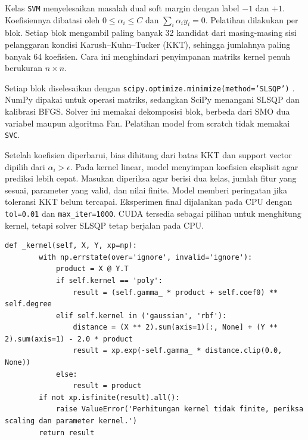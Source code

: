 Kelas \texttt{SVM} menyelesaikan masalah dual soft margin dengan label $-1$ dan $+1$. Koefisiennya dibatasi oleh $0\leq\alpha_i\leq C$ dan $\sum_i\alpha_i y_i=0$. Pelatihan dilakukan per blok. Setiap blok mengambil paling banyak 32 kandidat dari masing-masing sisi pelanggaran kondisi Karush--Kuhn--Tucker (KKT), sehingga jumlahnya paling banyak 64 koefisien. Cara ini menghindari penyimpanan matriks kernel penuh berukuran $n\times n$.

Setiap blok diselesaikan dengan \texttt{scipy.optimize.minimize(method='SLSQP')} \cite{ref:scipy_slsqp}. NumPy dipakai untuk operasi matriks, sedangkan SciPy menangani SLSQP dan kalibrasi BFGS. Solver ini memakai dekomposisi blok, berbeda dari SMO dua variabel maupun algoritma Fan. Pelatihan model from scratch tidak memakai \texttt{SVC}.

Setelah koefisien diperbarui, bias dihitung dari batas KKT dan support vector dipilih dari $\alpha_i>\epsilon$. Pada kernel linear, model menyimpan koefisien eksplisit agar prediksi lebih cepat. Masukan diperiksa agar berisi dua kelas, jumlah fitur yang sesuai, parameter yang valid, dan nilai finite. Model memberi peringatan jika toleransi KKT belum tercapai. Eksperimen final dijalankan pada CPU dengan \texttt{tol=0.01} dan \texttt{max\_iter=1000}. CUDA tersedia sebagai pilihan untuk menghitung kernel, tetapi solver SLSQP tetap berjalan pada CPU.

\begin{lstlisting}[caption={Perhitungan tiga kernel, diambil dari notebook SVM final},label={lst:svm_kernel}]
def _kernel(self, X, Y, xp=np):
        with np.errstate(over='ignore', invalid='ignore'):
            product = X @ Y.T
            if self.kernel == 'poly':
                result = (self.gamma_ * product + self.coef0) ** self.degree
            elif self.kernel in ('gaussian', 'rbf'):
                distance = (X ** 2).sum(axis=1)[:, None] + (Y ** 2).sum(axis=1) - 2.0 * product
                result = xp.exp(-self.gamma_ * distance.clip(0.0, None))
            else:
                result = product
        if not xp.isfinite(result).all():
            raise ValueError('Perhitungan kernel tidak finite, periksa scaling dan parameter kernel.')
        return result
\end{lstlisting}


